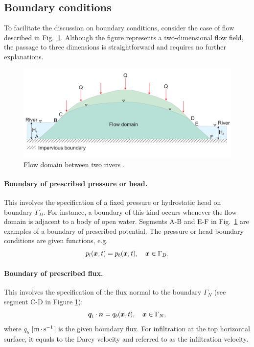 \subsection{Boundary conditions}
\label{sec:flow-boundary-conditions}


To facilitate the discussion on boundary conditions, consider the case of 
flow described in Fig.~\ref{fig:bc_flow}. 
Although the figure represents a two-dimensional flow field, the passage to three dimensions 
is straightforward and requires no further explanations. 

\begin{figure}  [h]
\begin{center} 
\includegraphics[scale=0.25]{figs/bc_flow.pdf}
\caption{Flow domain between two rivers \citep[it was partially based on]{bear-1972}.}
\label{fig:bc_flow}
\end{center}
\end{figure}

\paragraph{Boundary of prescribed pressure or head.}
This involves the specification of a fixed pressure or hydrostatic head on boundary $\Gamma_D$.
For instance, a boundary of this kind occurs whenever the flow domain is adjacent to a body of open water.
Segments A-B and E-F in Fig.~\ref{fig:bc_flow} are examples of a boundary of prescribed potential.
The pressure or head boundary conditions are given functions, e.g.
\begin{equation}
\label{eq:BC pressure}
  p_l({\boldsymbol{x}},t) = p_{b}({\boldsymbol{x}},t), \quad {\boldsymbol{x}} \in \Gamma_D. 
\end{equation}

\paragraph{Boundary of prescribed flux.}
This involves the specification of the flux normal to the boundary $\Gamma_N$
(see segment C-D in Figure \ref{fig:bc_flow}):
\begin{equation}
\label{eq:BC flux}
  {\boldsymbol{q}}_l\cdot \boldsymbol{n} = q_{b}({\boldsymbol{x}},t), \quad {\boldsymbol{x}} \in \Gamma_N,
\end{equation}
where $q_b$ [${\rm m}{\,\cdot\,}{\rm s}^{-1}$] is the given boundary flux. 
For infiltration at the top horizontal surface, it equals to the Darcy velocity
and referred to as the infiltration velocity.

